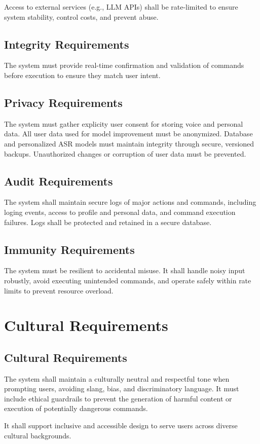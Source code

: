 \documentclass[11pt]{article}
\begin{document}
Access to external services (e.g., LLM APIs) shall be rate-limited to ensure system stability, control costs, and prevent abuse.
\subsection{Integrity Requirements}
The system must provide real-time confirmation and validation of commands before execution to ensure they match user intent. 
\subsection{Privacy Requirements}
The system must gather explicity user consent for storing voice and personal data. All user data used for model improvement must be anonymized. Database and personalized ASR models must maintain integrity through secure, versioned backups. Unauthorized changes or corruption of user data must be prevented. 
\subsection{Audit Requirements}
The system shall maintain secure logs of major actions and commands, including loging events, access to profile and personal data, and command execution failures. Logs shall be protected and retained in a secure database. 
\subsection{Immunity Requirements}
The system must be resilient to accidental misuse. It shall handle noisy input robustly, avoid executing unintended commands, and operate safely within rate limits to prevent resource overload. 

\section{Cultural Requirements}
\subsection{Cultural Requirements}
The system shall maintain a culturally neutral and respectful tone when prompting users, avoiding slang, bias, and discriminatory language. It must include ethical guardrails to prevent the generation of harmful content or execution of potentially dangerous commands.

It shall support inclusive and accessible design to serve users across diverse cultural backgrounds.
\end{document}
